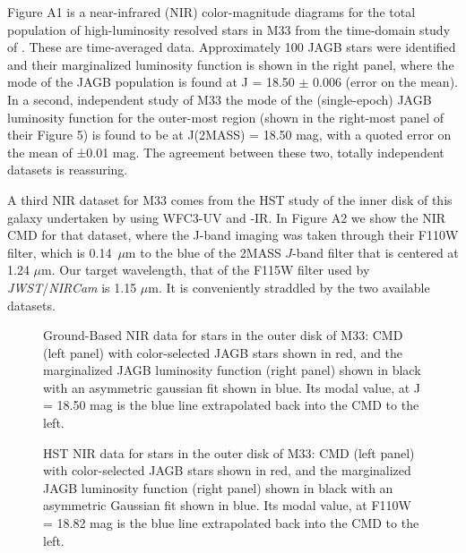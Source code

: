 \documentclass[12pt,modern]{aastex631}
\newcommand{\jwst}{\emph{JWST}\xspace}
\newcommand{\nircam}{\emph{NIRCam}\xspace}
\begin{document}
Figure A1 is a near-infrared (NIR) color-magnitude diagrams for the total population of high-luminosity resolved stars in M33 from the time-domain study of \citet{Javadi_2017}.
These are time-averaged data. 
Approximately 100 JAGB stars were identified and their marginalized luminosity function is shown in the right panel, where the mode of the JAGB population is found at J = 18.50 $\pm$ 0.006 (error on the mean). In a second, independent study of M33 \citep{lee_2022}  the mode of the (single-epoch) JAGB luminosity function for the outer-most region (shown in the right-most panel of their Figure 5) is found to be at J(2MASS) = 18.50 mag, with a quoted error on the mean of ±0.01 mag. The agreement between these two, totally independent datasets is reassuring.

A third NIR dataset for M33 comes from the HST study of the inner disk of this galaxy undertaken by \citet{Williams_2021} using WFC3-UV and -IR. In Figure A2 we show the NIR CMD for that dataset, where the J-band imaging was taken through their F110W filter, which is 0.14~$\mu$m to the blue of the 2MASS $J$-band filter that is centered at 1.24 $\mu$m. Our target wavelength, that of the F115W filter used by \jwst/\nircam is 1.15 $\mu$m. It is conveniently straddled by the two available datasets. 

\begin{figure}[ht!]
\caption{Ground-Based NIR data for stars in the outer disk of M33: CMD (left panel) with color-selected JAGB stars shown in red, and the marginalized JAGB luminosity function (right panel) shown in black with an asymmetric gaussian fit shown in blue. Its modal value, at J = 18.50 mag is the blue line extrapolated back into the CMD to the left.}
\label{fig:M33-AGB-OUTER}
\end{figure}    

\begin{figure}[ht!]
\label{fig:M33-HST-CMD}
\caption{HST NIR data for stars in the outer disk of M33: CMD (left panel) with color-selected JAGB stars shown in red, and the marginalized JAGB luminosity function (right panel) shown in black with an asymmetric Gaussian fit shown in blue. Its modal value, at F110W = 18.82 mag is the blue line extrapolated back into the CMD to the left.}
\end{figure}

\end{document}
